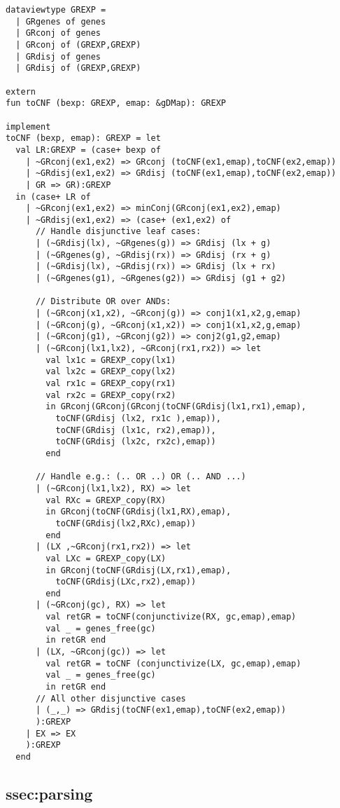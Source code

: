 \begin{verbatim}
dataviewtype GREXP = 
  | GRgenes of genes
  | GRconj of genes
  | GRconj of (GREXP,GREXP)
  | GRdisj of genes
  | GRdisj of (GREXP,GREXP)

extern
fun toCNF (bexp: GREXP, emap: &gDMap): GREXP

implement
toCNF (bexp, emap): GREXP = let     
  val LR:GREXP = (case+ bexp of 
    | ~GRconj(ex1,ex2) => GRconj (toCNF(ex1,emap),toCNF(ex2,emap))
    | ~GRdisj(ex1,ex2) => GRdisj (toCNF(ex1,emap),toCNF(ex2,emap))   
    | GR => GR):GREXP
  in (case+ LR of  
    | ~GRconj(ex1,ex2) => minConj(GRconj(ex1,ex2),emap) 
    | ~GRdisj(ex1,ex2) => (case+ (ex1,ex2) of
      // Handle disjunctive leaf cases:         
      | (~GRdisj(lx), ~GRgenes(g)) => GRdisj (lx + g) 
      | (~GRgenes(g), ~GRdisj(rx)) => GRdisj (rx + g)
      | (~GRdisj(lx), ~GRdisj(rx)) => GRdisj (lx + rx)
      | (~GRgenes(g1), ~GRgenes(g2)) => GRdisj (g1 + g2)

      // Distribute OR over ANDs:
      | (~GRconj(x1,x2), ~GRconj(g)) => conj1(x1,x2,g,emap) 
      | (~GRconj(g), ~GRconj(x1,x2)) => conj1(x1,x2,g,emap) 
      | (~GRconj(g1), ~GRconj(g2)) => conj2(g1,g2,emap)
      | (~GRconj(lx1,lx2), ~GRconj(rx1,rx2)) => let
        val lx1c = GREXP_copy(lx1)
        val lx2c = GREXP_copy(lx2) 
        val rx1c = GREXP_copy(rx1)
        val rx2c = GREXP_copy(rx2) 
        in GRconj(GRconj(GRconj(toCNF(GRdisj(lx1,rx1),emap), 
          toCNF(GRdisj (lx2, rx1c ),emap)),
          toCNF(GRdisj (lx1c, rx2),emap)), 
          toCNF(GRdisj (lx2c, rx2c),emap)) 
        end

      // Handle e.g.: (.. OR ..) OR (.. AND ...) 
      | (~GRconj(lx1,lx2), RX) => let
        val RXc = GREXP_copy(RX)
        in GRconj(toCNF(GRdisj(lx1,RX),emap),
          toCNF(GRdisj(lx2,RXc),emap)) 
        end
      | (LX ,~GRconj(rx1,rx2)) => let
        val LXc = GREXP_copy(LX)
        in GRconj(toCNF(GRdisj(LX,rx1),emap),
          toCNF(GRdisj(LXc,rx2),emap)) 
        end
      | (~GRconj(gc), RX) => let
        val retGR = toCNF(conjunctivize(RX, gc,emap),emap)
        val _ = genes_free(gc)
        in retGR end
      | (LX, ~GRconj(gc)) => let
        val retGR = toCNF (conjunctivize(LX, gc,emap),emap)
        val _ = genes_free(gc)
        in retGR end
      // All other disjunctive cases
      | (_,_) => GRdisj(toCNF(ex1,emap),toCNF(ex2,emap))
      ):GREXP
    | EX => EX
    ):GREXP
  end
\end{verbatim}

\subsection{ssec:parsing}

